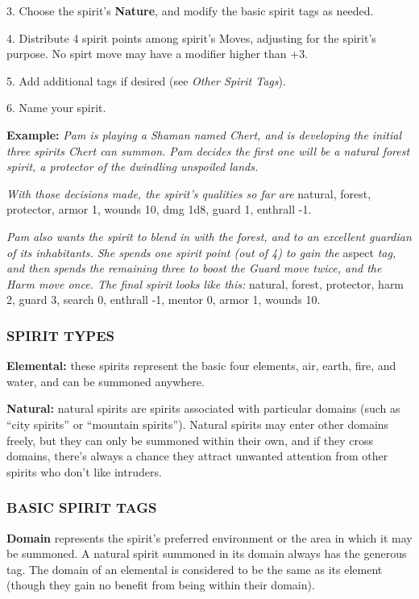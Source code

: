 \documentclass[oneside,10pt]{article}
\begin{document}
\begin{multicols}{2}
\begin{adjustwidth*}{.5cm}{.5cm}
3.	Choose the spirit’s \textbf{Nature}, and modify the basic spirit
tags as needed.

4.	Distribute 4 spirit points among spirit’s Moves, adjusting for the spirit’s purpose. No spirt move may have a
modifier higher than +3.

5.	Add additional tags if desired (see \textit{Other Spirit Tags}).

6.	Name your spirit.

\textbf{Example:} \textit{Pam is playing a Shaman named Chert, and is
developing the initial three spirits Chert can summon. Pam
decides the first one will be a natural forest spirit, a protector of the dwindling unspoiled lands.}

\textit{With those decisions made, the spirit’s qualities so far are}
natural, forest, protector, armor 1, wounds 10, dmg 1d8,
guard 1, enthrall -1.

\textit{Pam also wants the spirit to blend in with the forest, and
to an excellent guardian of its inhabitants. She spends
one spirit point (out of 4) to gain the} aspect \textit{tag, and then
spends the remaining three to boost the Guard move
twice, and the Harm move once. The final spirit looks like
this:} natural, forest, protector, harm 2, guard 3, search 0,
enthrall -1, mentor 0, armor 1, wounds 10.
\end{adjustwidth*}
\subsubsection{SPIRIT TYPES}
\begin{adjustwidth*}{.5cm}{.5cm}

\textbf{Elemental:} these spirits represent the basic four elements,
air, earth, fire, and water, and can be summoned anywhere.

\textbf{Natural:} natural spirits are spirits associated with particular domains (such as “city spirits” or “mountain spirits”).
Natural spirits may enter other domains freely, but they
can only be summoned within their own, and if they cross
domains, there’s always a chance they attract unwanted
attention from other spirits who don’t like intruders.
\end{adjustwidth*}
\subsubsection{BASIC SPIRIT TAGS}
\textbf{Domain} represents the spirit’s preferred environment or the
area in which it may be summoned. A natural spirit summoned in its domain always has the generous tag. The domain of an elemental is considered to be the same as its element (though they gain no benefit from being within their
domain).
\begin{adjustwidth*}{.5cm}{.5cm}


\end{adjustwidth*}
\end{multicols}
\end{document}
